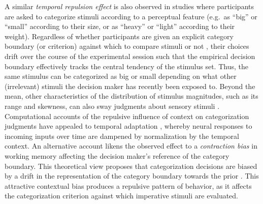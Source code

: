 \documentclass[a4paper, nobind]{templates/ociamthesis}
\begin{document}
A similar \emph{temporal repulsion effect} is also observed in studies where participants are asked to categorize stimuli according to a perceptual feature (e.g.~as ``big'' or ``small'' according to their size, or as ``heavy'' or ``light'' according to their weight). Regardless of whether participants are given an explicit category boundary (or criterion) against which to compare stimuli \autocites[e.g.][]{lages1998,olkkonen2014} or not \autocites[e.g.][]{helson1947,morgan2000,levari2018}, their choices drift over the course of the experimental session such that the empirical decision boundary effectively tracks the central tendency of the stimulus set. Thus, the same stimulus can be categorized as big or small depending on what other (irrelevant) stimuli the decision maker has recently been exposed to. Beyond the mean, other characteristics of the distribution of stimulus magnitudes, such as its range and skewness, can also sway judgments about sensory stimuli \autocite{parducci1965}. Computational accounts of the repulsive influence of context on categorization judgments have appealed to temporal adaptation \autocite{helson1964,parducci1965}, whereby neural responses to incoming inputs over time are dampened by normalization by the temporal context. An alternative account likens the observed effect to a \emph{contraction bias} in working memory \autocite[also known as central tendency bias,][]{hollingworth1910} affecting the decision maker's reference of the category boundary. This theoretical view proposes that categorization decisions are biased by a drift in the representation of the category boundary towards the prior \autocites[e.g.~midpoint of the stimulus set, contextual expectation, etc.,][]{treisman1984,jou2004,olkkonen2014}. This attractive contextual bias produces a repulsive pattern of behavior, as it affects the categorization criterion against which imperative stimuli are evaluated.
\end{document}
